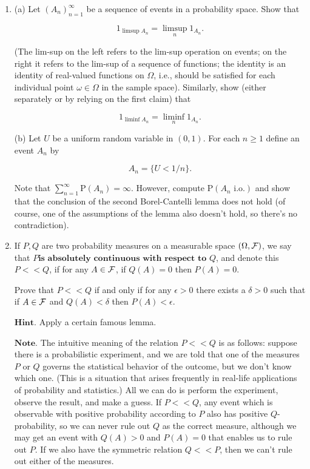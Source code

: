 \begin{enumerate}[label=\arabic*.]
\begin{enumerate}[label=\arabic*.]
\item $X \sim \textrm{Exp}(1),\ Y \sim \textrm{Exp}(1)$.

\item $X \sim \textrm{Exp}(1),\  -Y \sim \textrm{Exp}(1)$.
\end{enumerate}

\item (a) Let $(A_n)_{n=1}^\infty$ be a sequence of events
in a probability space. Show that

\[
1_{\limsup A_n} = \limsup_n 1_{A_n}.
\]

\noindent (The lim-sup on the left refers to the lim-sup
operation on events; on the right it refers to the
lim-sup of a sequence of functions; the identity is an
identity of real-valued functions on $\Omega$, i.e.,
should be satisfied for each individual point
$\omega \in \Omega$ in the sample space). Similarly,
show (either separately or by relying on the first
claim) that

\[
1_{\liminf A_n} = \liminf_n 1_{A_n}.
\]

\noindent (b) Let $U$ be a uniform random variable in $(0,1)$.
For each $n\ge 1$ define an event $A_n$ by

\[
A_n = \{U < 1/n\}.
\]

\noindent Note that
$\sum_{n=1}^\infty \mathrm{P}(A_n) = \infty$.
However, compute $\mathrm{P}(A_n\textrm{ i.o.})$ and
show that the conclusion of the second Borel-Cantelli
lemma does not hold (of course, one of the assumptions
of the lemma also doesn't hold, so there's no
contradiction).

\item If $P,Q$ are two probability measures on a measurable
space $(\Omega, {\cal F})$, we say that $\textbf{$P
$is absolutely continuous with respect to } Q$, and
denote this $P<<Q$, if for any $A\in {\cal F}$, if
$Q(A)=0$ then $P(A)=0$.

Prove that $P<<Q$ if and only if for any $\epsilon>0$
there exists a $\delta>0$ such that if $A\in {\cal F}$
and $Q(A)<\delta$ then $P(A)<\epsilon$.

$\textbf{Hint.}$ Apply a certain famous lemma.

$\textbf{Note.}$ The intuitive meaning of the
relation $P<<Q$ is as follows: suppose there is a
probabilistic experiment, and we are told that one of
the measures $P$ or $Q$ governs the statistical
behavior of the outcome, but we don't know which one.
(This is a situation that arises frequently in
real-life applications of probability and statistics.)
All we can do is perform the experiment, observe the
result, and make a guess. If $P<<Q$, any event which
is observable with positive probability according to
$P$ also has positive $Q$-probability, so we can
never rule out $Q$ as the correct measure, although
we may get an event with $Q(A)>0$ and $P(A)=0$ that
enables us to rule out $P$. If we also have the
symmetric relation $Q<<P$, then we can't rule out
either of the measures.


\end{enumerate}
